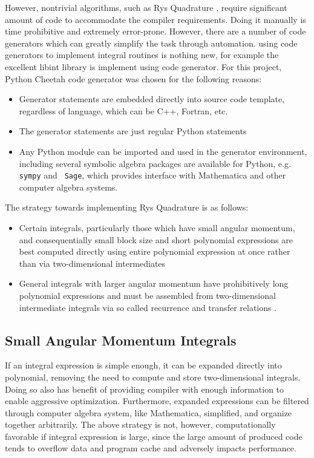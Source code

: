 \documentclass[12pt]{article}
\begin{document}
However, nontrivial algorithms, such as Rys Quadrature
\cite{rys_computation_1983}, require significant amount of code to
accommodate the compiler requirements.  Doing it manually is time
prohibitive and extremely error-prone.  However, there are a number of
code generators which can greatly simplify the task through
automation.  using code generators to implement integral routines is
nothing new, for example the excellent libint \cite{libint} library is
implement using code generator.  For this project, Python Cheetah code
generator \cite{cheetah} was chosen for the following reasons:

\begin{itemize}
\item Generator statements are embedded directly into source code template,
  regardless of language, which can be C++, Fortran, etc.
\item The generator statements are just regular Python statements
\item Any Python module can be imported and used in the generator
  environment, including several symbolic algebra packages are
  available for Python, e.g.  {\tt sympy}\cite{sympy} and {\tt
    Sage}\cite{sage}, which provides interface with Mathematica
  \cite{wolfram_mathematicarbook_2003} and other computer algebra
  systems.
\end{itemize}

The strategy towards implementing Rys Quadrature is as follows:
\begin{itemize}
\item Certain integrals, particularly those which have small angular momentum,
  and consequentially small block size and short polynomial expressions are best
  computed directly using entire polynomial expression at once rather than via
  two-dimensional intermediates
\item General integrals with larger angular momentum have prohibitively long polynomial
  expressions and must be assembled from two-dimensional intermediate
  integrals via so called recurrence and transfer relations \cite{rys_computation_1983}. 
\end{itemize}

\subsection*{Small Angular Momentum Integrals}
If an integral expression is simple enough, it can be expanded directly into
polynomial, removing the need to compute and store two-dimensional integrals.
Doing so also has benefit of providing compiler with enough information to
enable aggressive optimization.  Furthermore, expanded expressions can be
filtered through computer algebra system, like Mathematica, simplified, and
organize together arbitrarily.
The above strategy is not, however, computationally favorable if integral
expression is large, since the large amount of produced code tends to overflow
data and program cache and adversely impacts performance.
\end{document}
